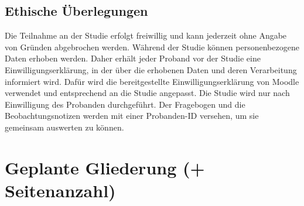 \documentclass[12pt, a4paper]{article}
\begin{document}
\subsection{Ethische Überlegungen}

Die Teilnahme an der Studie erfolgt freiwillig und kann jederzeit ohne Angabe von Gründen abgebrochen werden. Während der Studie können personenbezogene Daten erhoben werden. Daher erhält jeder Proband vor der Studie eine Einwilligungserklärung, in der über die erhobenen Daten und deren Verarbeitung informiert wird. Dafür wird die bereitgestellte Einwilligungserklärung von Moodle verwendet und entsprechend an die Studie angepasst. Die Studie wird nur nach Einwilligung des Probanden durchgeführt. Der Fragebogen und die Beobachtungsnotizen werden mit einer Probanden-ID versehen, um sie gemeinsam auswerten zu können.

\section{Geplante Gliederung (+ Seitenanzahl)}
\end{document}
